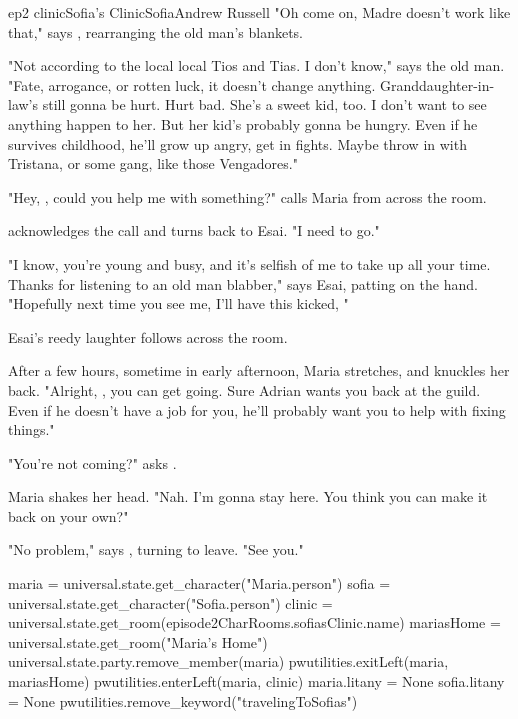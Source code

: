 \documentclass{book}
\begin{document}
\begin{node}{ep2 clinic}{Sofia's Clinic}{Sofia}{Andrew Russell}
    "Oh come on, Madre doesn't work like that," says \name{}, rearranging the old man's blankets.  

    "Not according to the local local Tios and Tias. I don't know," says the old man. "Fate, arrogance, or rotten luck, it doesn't change anything. Granddaughter-in-law's still gonna be hurt. Hurt 
    bad. She's a sweet kid, too. I don't want to see anything happen to 
    her. But her kid's probably gonna be hungry. Even if he survives childhood, he'll grow up angry, get in fights. Maybe throw in with Tristana, or some gang, like those Vengadores."

    "Hey, \name{}, could you help me with something?" calls Maria from across the room.

    \name{} acknowledges the call and turns back to Esai. "I need to go."

    "I know, you're young and busy, and it's selfish of me to take up all your time. Thanks for listening to an old man blabber," says Esai, patting \name{} on the hand. "Hopefully next time you see me, I'll have this kicked, 
    "


    Esai's reedy laughter follows \name{} across the room.

    After a few hours, sometime in early afternoon, Maria stretches, and knuckles her back. "Alright, \name{}, you can get going. Sure Adrian wants you back at the guild. Even if he doesn't have a job for you, he'll probably want you to help with fixing
    things."

    "You're not coming?" asks \name{}.

    Maria shakes her head. "Nah. I'm gonna stay here. You think you can make it back on your own?"

    "No problem," says \name{}, turning to leave. "See you."

    \begin{code}

        maria = universal.state.get_character("Maria.person")
        sofia = universal.state.get_character("Sofia.person")
        clinic = universal.state.get_room(episode2CharRooms.sofiasClinic.name)
        mariasHome = universal.state.get_room("Maria's Home")
        universal.state.party.remove_member(maria)
        pwutilities.exitLeft(maria, mariasHome)
        pwutilities.enterLeft(maria, clinic)
        maria.litany = None
        sofia.litany = None
        pwutilities.remove_keyword("travelingToSofias")

    \end{code}
        
\end{node}
\end{document}
